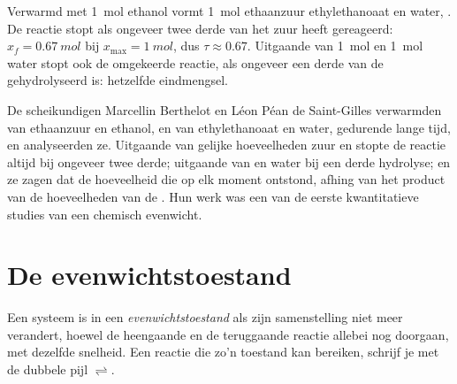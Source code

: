 \begin{example}\label{ex:g12:equilibrium:berthelot}
Verwarmd met \qty{1}{mol} ethanol vormt \qty{1}{mol} ethaanzuur
ethylethanoaat en water,
. De reactie stopt als ongeveer
twee derde van het zuur heeft gereageerd: $x_f = \qty{0.67}{mol}$ bij
$x_{\max} = \qty{1}{mol}$, dus $\tau \approx 0.67$. Uitgaande van
\qty{1}{mol}  en \qty{1}{mol} water stopt ook de omgekeerde reactie,
als ongeveer een derde van de  gehydrolyseerd is: hetzelfde
eindmengsel.
\end{example}

\begin{history}
De scheikundigen Marcellin Berthelot en Léon Péan de Saint-Gilles
verwarmden  van ethaanzuur en ethanol, en van ethylethanoaat en
water, gedurende lange tijd, en analyseerden ze. Uitgaande van gelijke
hoeveelheden zuur en  stopte de reactie altijd bij ongeveer twee
derde; uitgaande van  en water bij een derde hydrolyse; en ze zagen
dat de hoeveelheid  die op elk moment ontstond, afhing van het
product van de hoeveelheden van de . Hun werk was een van de
eerste kwantitatieve studies van een chemisch evenwicht.
\end{history}

\section{De evenwichtstoestand}

\begin{definition}[Evenwichtstoestand]\label{def:g12:equilibrium:equilibrium-state}
Een systeem is in een \emph{evenwichtstoestand}
als zijn samenstelling niet meer verandert, hoewel de heengaande en de
teruggaande reactie allebei nog doorgaan, met dezelfde snelheid. Een
reactie die zo'n toestand kan bereiken, schrijf je met de dubbele pijl
$\rightleftharpoons$.
\end{definition}

